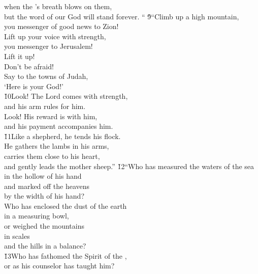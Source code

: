 \begin{poetry}
\poemll    when the 's breath blows on them, \\
\poemlll       but the word of our God will stand forever. ``
\poeml \v{9}``Climb up a high mountain, \\
\poemll    you messenger of good news to Zion! \\
\poeml Lift up your voice with strength, \\
\poemll    you messenger to Jerusalem! \\
\poeml Lift it up! \\
\poemll    Don't be afraid! \\
\poeml Say to the towns of Judah, \\
\poemll    `Here is your God!' \\
\poeml \v{10}Look! The Lord  comes with strength, \\
\poemll    and his arm rules for him. \\
\poeml Look! His reward is with him, \\
\poemll    and his payment accompanies him. \\
\poeml \v{11}Like a shepherd, he tends his flock. \\
\poemll    He gathers the lambs in his arms, \\
\poeml carries them close to his heart, \\
\poemll    and gently leads the mother sheep.''
\poeml \v{12}``Who has measured the waters of the sea \\
\poemll    in the hollow of his hand \\
\poeml and marked off the heavens \\
\poemll    by the width of his hand? \\
\poeml Who has enclosed the dust of the earth \\
\poemll    in a measuring bowl, \\
\poeml or weighed the mountains \\
\poemll    in scales \\
\poemlll       and the hills in a balance? \\
\poeml \v{13}Who has fathomed the Spirit of the , \\
\poemll    or as his counselor has taught him? \\

\end{poetry}
